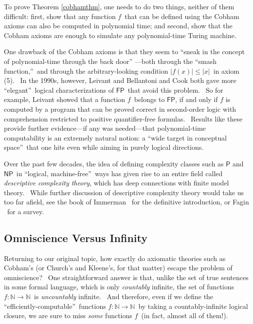 \documentclass[11pt,onecolumn]{article}%
\begin{document}
To prove Theorem \ref{cobhamthm}, one needs to do two things, neither of them
difficult: first, show that any function $f$\ that can be defined using the
Cobham axioms can also be computed in polynomial time; and second, show that
the Cobham axioms are enough to simulate any polynomial-time Turing machine.

One drawback of the Cobham axioms is that they seem to \textquotedblleft sneak
in the concept of polynomial-time through the back door\textquotedblright%
---both through the \textquotedblleft smash function,\textquotedblright\ and
through the arbitrary-looking condition $\left\vert f\left(  x\right)
\right\vert \leq\left\vert x\right\vert $\ in axiom (5). \ In the 1990s,
however, Leivant \cite{leivant} and Bellantoni and Cook \cite{bellantonicook}
both gave more \textquotedblleft elegant\textquotedblright\ logical
characterizations of $\mathsf{FP}$\ that avoid this problem. \ So for example,
Leivant showed that a function $f$\ belongs to $\mathsf{FP}$, if and only if
$f$ is computed by a program that can be proved correct in second-order logic
with comprehension restricted to positive quantifier-free formulas. \ Results
like these provide further evidence---if any was needed---that polynomial-time
computability is an extremely natural notion: a \textquotedblleft wide target
in conceptual space\textquotedblright\ that one hits even while aiming in
purely logical directions.

Over the past few decades, the idea of defining complexity classes such as
$\mathsf{P}$ and $\mathsf{NP}$\ in \textquotedblleft logical,
machine-free\textquotedblright\ ways has given rise to an entire field called
\textit{descriptive complexity theory}, which has deep connections with finite
model theory. \ While further discussion of descriptive complexity theory
would take us too far afield, see the book of Immerman \cite{immerman}\ for
the definitive introduction, or Fagin \cite{fagin}\ for a survey.

\subsection{Omniscience Versus Infinity\label{OMNIINF}}

Returning to our original topic, how exactly do axiomatic theories such as
Cobham's (or Church's and Kleene's, for that matter) escape the problem of
omniscience? \ One straightforward answer is that, unlike the set of true
sentences in some formal language, which is only \textit{countably} infinite,
the set of functions $f:\mathbb{N}\rightarrow\mathbb{N}$\ is
\textit{uncountably} infinite. \ And therefore, even if we define the
\textquotedblleft efficiently-computable\textquotedblright\ functions
$f:\mathbb{N}\rightarrow\mathbb{N}$\ by taking a countably-infinite logical
closure, we are sure to miss \textit{some} functions $f$\ (in fact, almost all
of them!).
\end{document}
